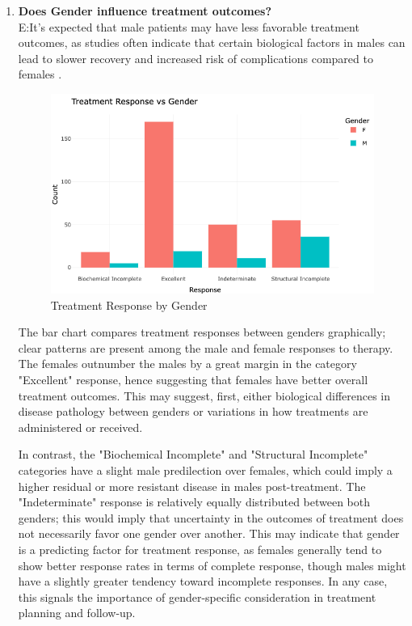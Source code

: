 \documentclass[12pt]{article}
\begin{document}
\begin{enumerate}
\newpage
    
    \item \textbf{Does Gender  influence treatment outcomes?}\\ 
 E:It’s expected that male patients  may have less favorable treatment outcomes, as studies often indicate that  certain biological factors in males can lead to slower recovery and increased risk of complications compared to females .

   \begin{figure}[h]
        \vspace{5pt}
        \centering
        \includegraphics[width=1\textwidth]{treatment vs gender.png}  
        \caption{Treatment Response by Gender}
            \label{fig:example}
       \vspace{0.5cm}
    \end{figure}

The bar chart compares treatment responses between genders graphically; clear patterns are present among the male and female responses to therapy. The females outnumber the males by a great margin in the category "Excellent" response, hence suggesting that females have better overall treatment outcomes. This may suggest, first, either biological differences in disease pathology between genders or variations in how treatments are administered or received.

In contrast, the "Biochemical Incomplete" and "Structural Incomplete" categories have a slight male predilection over females, which could imply a higher residual or more resistant disease in males post-treatment. The "Indeterminate" response is relatively equally distributed between both genders; this would imply that uncertainty in the outcomes of treatment does not necessarily favor one gender over another. This may indicate that gender is a predicting factor for treatment response, as females generally tend to show better response rates in terms of complete response, though males might have a slightly greater tendency toward incomplete responses. In any case, this signals the importance of gender-specific consideration in treatment planning and follow-up.


\end{enumerate}
\end{document}
